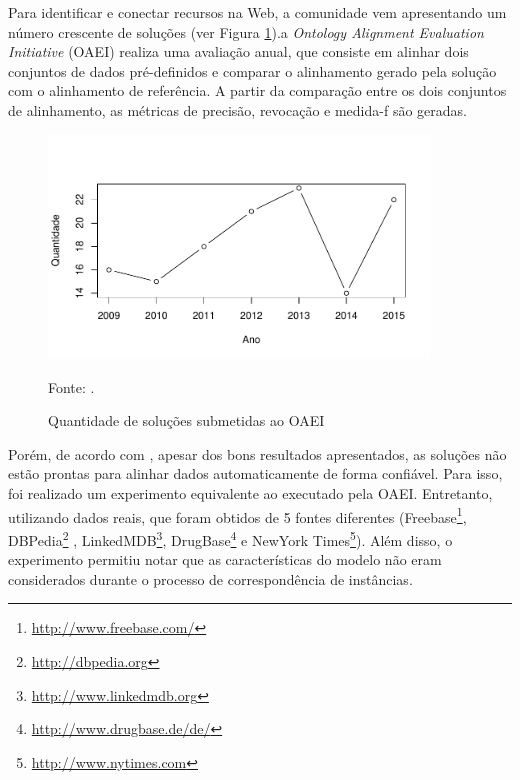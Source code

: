 Para identificar e conectar recursos na Web, a comunidade vem apresentando um número crescente de soluções (ver Figura \ref{fig:oaei_imtools}).a \textit{Ontology Alignment Evaluation Initiative} (OAEI) realiza uma avaliação anual, que consiste em alinhar dois conjuntos de dados pré-definidos e comparar o alinhamento gerado pela solução com o alinhamento de referência. A partir da comparação entre os dois conjuntos de alinhamento, as métricas de precisão, revocação e medida-f são geradas.


\begin{figure}[!h]
        \centering
        \includegraphics[width=0.9\textwidth]{./imagens/im_tools.pdf}
    \caption{Quantidade de soluções submetidas ao OAEI}
        \footnotesize{Fonte: \cite{cheatham2015results}.}
        \label{fig:oaei_imtools}
\end{figure}

Porém, de acordo com , apesar dos bons resultados apresentados, as soluções não estão prontas para alinhar dados automaticamente de forma confiável. Para isso, foi realizado um experimento equivalente ao executado pela OAEI. Entretanto, utilizando dados reais, que foram obtidos de 5 fontes diferentes (Freebase\footnote{\url{http://www.freebase.com/}}, DBPedia\footnote{\url{http://dbpedia.org}} , LinkedMDB\footnote{\url{http://www.linkedmdb.org}}, DrugBase\footnote{\url{http://www.drugbase.de/de/}} e NewYork Times\footnote{\url{http://www.nytimes.com}}). Além disso, o experimento permitiu notar que as características do modelo não eram considerados durante o processo de correspondência de instâncias.

